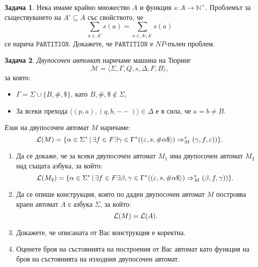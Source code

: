 \documentclass[a4paper]{article}
\theoremstyle{definition}
\newtheorem{problem}{Задача}
\begin{document}
\begin{problem}
  Нека имаме крайно множество $A$ и функция $s:A \to \mathbb{N}^+$.
  Проблемът за съществуването на $A' \subseteq A$ със свойството, че
  \[\sum_{a\in A'}s(a) = \sum_{a \in A\setminus A'} s(a)\]
  се нарича $\texttt{PARTITION}$.
  Докажете, че $\texttt{PARTITION}$ е $NP$-пълен проблем.
\end{problem}


\begin{problem}
  \emph{Двупосочен автомат} наричаме машина на Тюринг
  \[\mathcal{M}=\langle \Sigma,\Gamma,Q,s,\Delta,F,B\rangle,\] за която:
\begin{itemize}
\item $\Gamma=\Sigma\cup \{B,\#,\$\}$, като $B,\#,\$\not\in \Sigma$,
\item За всеки прехода $\langle (p,a),(q,b,--)\rangle\in \Delta$ е в сила, че $a=b\neq B$.
\end{itemize}
\emph{Език} на двупосочен автомат $M$ наричаме:
\begin{equation*}
{\cal L}(M)=\{\alpha\in \Sigma^*\,|\,\exists f\in F\exists \gamma\in \Gamma^*( (\varepsilon,s,\#\alpha\$\rangle)\Rightarrow^*_M (\gamma,f,\varepsilon))\}.
\end{equation*}
\begin{enumerate}
\item Да се докаже, че за всеки двупосочен автомат $M_1$ има двупосочен автомат $M_2$ над същата азбука, за който:
\begin{equation*}
{\cal L}(M_2) = \{\alpha\in \Sigma^* \,|\, \exists f\in F\exists \beta,\gamma\in \Gamma^*((\varepsilon,s,\#\alpha\$\rangle)\Rightarrow^*_M (\beta,f,\gamma))\}.
\end{equation*}
\item Да се опише конструкция, която по даден двупосочен автомат $M$ построява краен автомат $A$ с азбука $\Sigma$, за който:
\begin{equation*}
{\cal L}(M)={\cal L}(A).
\end{equation*}
\item Докажете, че описаната от Вас конструкция е коректна. 
\item Оценете броя на състоянията на построения от Вас автомат като функция на броя
на състоянията на изходния двупосочен автомат.
\end{enumerate}
\end{problem}
\end{document}
